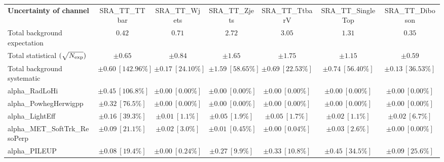
\begin{sidewaystable}
\begin{center}
\setlength{\tabcolsep}{0.0pc}
\begin{tabular*}{\textwidth}{@{\extracolsep{\fill}}lcccccc}
\noalign{\smallskip}\hline\noalign{\smallskip}
{\bf Uncertainty of channel}                                    & SRA\_TT\_TTbar            & SRA\_TT\_Wjets            & SRA\_TT\_Zjets            & SRA\_TT\_TtbarV            & SRA\_TT\_SingleTop            & SRA\_TT\_Diboson            \\
\noalign{\smallskip}\hline\noalign{\smallskip}
Total background expectation             &  $0.42$        &  $0.71$        &  $2.72$        &  $3.05$        &  $1.31$        &  $0.35$       \\
\noalign{\smallskip}\hline\noalign{\smallskip}
Total statistical $(\sqrt{N_{\rm exp}})$              & $\pm 0.65$        & $\pm 0.84$        & $\pm 1.65$        & $\pm 1.75$        & $\pm 1.15$        & $\pm 0.59$       \\
Total background systematic               & $\pm 0.60\ [142.96\%] $        & $\pm 0.17\ [24.10\%] $        & $\pm 1.59\ [58.65\%] $        & $\pm 0.69\ [22.53\%] $        & $\pm 0.74\ [56.40\%] $        & $\pm 0.13\ [36.53\%] $             \\
\noalign{\smallskip}\hline\noalign{\smallskip}
\noalign{\smallskip}\hline\noalign{\smallskip}
alpha\_RadLoHi         & $\pm 0.45\ [106.8\%] $          & $\pm 0.00\ [0.00\%] $          & $\pm 0.00\ [0.00\%] $          & $\pm 0.00\ [0.00\%] $          & $\pm 0.00\ [0.00\%] $          & $\pm 0.00\ [0.00\%] $       \\
alpha\_PowhegHerwigpp         & $\pm 0.32\ [76.5\%] $          & $\pm 0.00\ [0.00\%] $          & $\pm 0.00\ [0.00\%] $          & $\pm 0.00\ [0.00\%] $          & $\pm 0.00\ [0.00\%] $          & $\pm 0.00\ [0.00\%] $       \\
alpha\_LightEff         & $\pm 0.16\ [39.3\%] $          & $\pm 0.01\ [1.1\%] $          & $\pm 0.05\ [1.9\%] $          & $\pm 0.05\ [1.7\%] $          & $\pm 0.02\ [1.1\%] $          & $\pm 0.02\ [6.7\%] $       \\
alpha\_MET\_SoftTrk\_ResoPerp         & $\pm 0.09\ [21.1\%] $          & $\pm 0.02\ [3.0\%] $          & $\pm 0.01\ [0.45\%] $          & $\pm 0.00\ [0.04\%] $          & $\pm 0.03\ [2.6\%] $          & $\pm 0.00\ [0.00\%] $       \\
alpha\_PILEUP         & $\pm 0.08\ [19.4\%] $          & $\pm 0.00\ [0.24\%] $          & $\pm 0.27\ [9.9\%] $          & $\pm 0.33\ [10.8\%] $          & $\pm 0.45\ [34.5\%] $          & $\pm 0.09\ [25.6\%] $       \\

\end{tabular*}
\end{center}
\end{sidewaystable}
